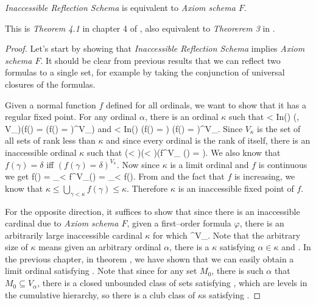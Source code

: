 \begin{theorem}
\emph{Inaccessible Reflection Schema} is equivalent to \emph{Axiom schema $F$}.
\end{theorem}

This is \emph{Theorem 4.1} in chapter 4 of \cite{DrakeBook}, also equivalent to \emph{Theorerem 3} in \cite{Levy60a}.

\begin{proof} 
Let's start by showing that \emph{Inaccessible Reflection Schema} implies \emph{Axiom schema $F$}. 
It should be clear from previous results that we can reflect two formulas to a single set, for example by taking the conjunction of universal closures of the formulas.

Given a normal function $f$ defined for all ordinals, we want to show that it has a regular fixed point. 
For any ordinal $\alpha$, there is an ordinal $\kappa$ such that 
\beq
\alpha < \kappa \et In(\kappa) \et (\forall \gamma, \delta \in V_\kappa)(f(\gamma) = \delta \iff (f(\gamma) = \delta)^{V_\kappa})
\eeq
and
\beq
\alpha < \kappa \et In(\kappa) \et \forall \gamma \exists \delta (f(\gamma) = \delta) \iff (\forall \gamma \exists \delta f(\gamma) = \delta)^{V_\kappa}\mbox{.}
\eeq
Since $V_\kappa$ is the set of all sets of rank less than $\kappa$ and since every ordinal is the rank of itself, there is an inaccessible ordinal $\kappa$ such that
\beq
(\forall \gamma < \kappa)(\exists \delta < \kappa)(f^{V_\kappa} (\gamma) = \delta)\label{eq:reflected_function}\mbox{.}
\eeq
We also know that $f(\gamma) = \delta$ iff $(f(\gamma) = \delta)^{V_\kappa}$. 
Now since $\kappa$ is a limit ordinal and $f$ is continuous we get
\beq
f(\kappa) = \bigcup_{\gamma < \kappa} f^{V_\kappa}(\gamma) = \bigcup_{\gamma < \kappa} f(\gamma)\mbox{.}
\eeq
From  and the fact that $f$ is increasing, we know that $\kappa \leq \bigcup_{\gamma < \kappa} f(\gamma) \leq \kappa$. Therefore $\kappa$ is an inaccessible fixed point of $f$.

For the opposite direction, it suffices to show that since there is an inaccessible cardinal due to \emph{Axiom schema $F$}, given a first–order formula $\varphi$, there is an arbitrarily large inaccessible cardinal $\kappa$ for which 
\beq
\varphi \iff \varphi^{V_\kappa}\mbox{.}\label{eq:ch3_f_iff_m_1}
\eeq
Note that the arbitrary size of $\kappa$ means given an arbitrary ordinal $\alpha$, there is a $\kappa$ satisfying $\alpha \in \kappa$ and .
In the previous chapter, in theorem , we have shown that we can easily obtain a limit ordinal satisfying . Note that since for any set $M_0$, there is such $\alpha$ that $M_0 \subseteq V_\alpha$, there is a closed unbounded class of sets satisfying , which are levels in the cumulative hierarchy, so there is a club class of $\kappa$s satisfying .


\end{proof}

